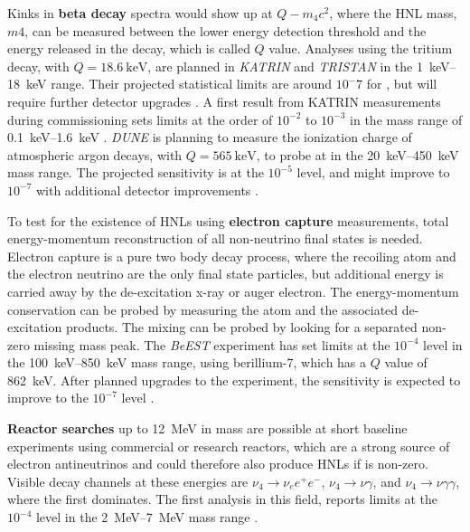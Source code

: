 Kinks in \textbf{beta decay} spectra would show up at $Q-m_4c^2$, where the HNL mass, $m4$, can be measured between the lower energy detection threshold and the energy released in the decay, which is called $Q$ value. Analyses using the tritium decay, with $Q=\SI{18.6}{\kilo\electronvolt}$, are planned in \textit{KATRIN}  and \textit{TRISTAN}  in the \SIrange{1}{18}{\kilo\electronvolt} range. Their projected statistical limits are around $10^-7$ for , but will require further detector upgrades \cite{Mertens_2019}. A first result from KATRIN measurements during commissioning sets limits at the order of $10^{-2}$ to $10^{-3}$ in the mass range of \SIrange{0.1}{1.6}{\kilo\electronvolt} . \textit{DUNE} is planning to measure the ionization charge of atmospheric argon decays, with $Q=\SI{565}{\kilo\electronvolt}$, to probe  at in the \SIrange{20}{450}{\kilo\electronvolt} mass range. The projected sensitivity is at the $10^{-5}$ level, and might improve to $10^{-7}$ with additional detector improvements .

To test for the existence of HNLs using \textbf{electron capture} measurements, total energy-momentum reconstruction of all non-neutrino final states is needed. Electron capture is a pure two body decay process, where the recoiling atom and the electron neutrino are the only final state particles, but additional energy is carried away by the de-excitation x-ray or auger electron. The energy-momentum conservation can be probed by measuring the atom and the associated de-excitation products. The mixing  can be probed by looking for a separated non-zero missing mass peak. The \textit{BeEST} experiment has set limits at the $10^{-4}$ level in the \SIrange{100}{850}{\kilo\electronvolt} mass range, using berillium-7, which has a $Q$ value of \SI{862}{\kilo\electronvolt}. After planned upgrades to the experiment, the sensitivity is expected to improve to the $10^{-7}$ level .

\textbf{Reactor searches} up to \SI{12}{\mega\electronvolt} in mass are possible at short baseline experiments using commercial or research reactors, which are a strong source of electron antineutrinos and could therefore also produce HNLs if  is non-zero. Visible decay channels at these energies are $\nu_4 \rightarrow \nu_e e^+ e^-$, $\nu_4 \rightarrow \nu \gamma$, and $\nu_4 \rightarrow \nu \gamma \gamma$, where the first dominates. The first analysis in this field, reports limits at the $10^{-4}$ level in the \SIrange{2}{7}{\mega\electronvolt} mass range .

